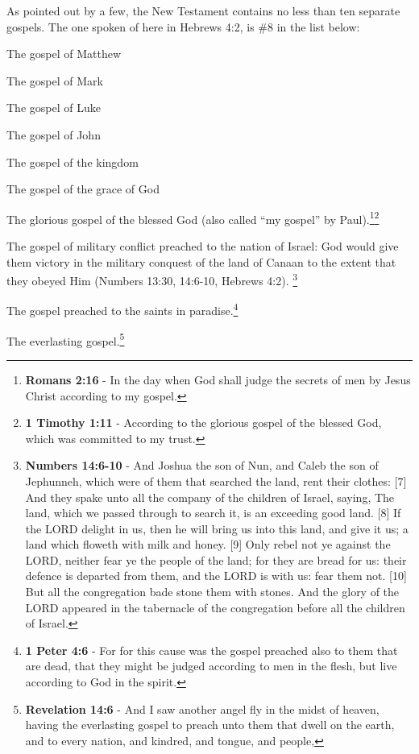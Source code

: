 As pointed out by a few, the New Testament contains no less than ten separate gospels. The one spoken of here in Hebrews 4:2, is \#8 in the list below:
\begin{compactenum}
	\item The gospel of Matthew
	\item The gospel of Mark
	\item The gospel of Luke
	\item The gospel of John
	\item The gospel of the kingdom
	\item The gospel of the grace of God
	\item The glorious gospel of the blessed God	(also called ``my gospel'' by Paul).\footnote{\textbf{Romans 2:16} - In the day when God shall judge the secrets of men by Jesus Christ according to my gospel.}\footnote{\textbf{1 Timothy 1:11} - According to the glorious gospel of the blessed God, which was committed to my trust.}
	\item The gospel of military conflict preached to the nation of Israel: God would give them victory in the military conquest of the land of Canaan to the extent that they obeyed Him (Numbers 13:30, 14:6-10, Hebrews 4:2). \footnote{\textbf{Numbers 14:6-10} - And Joshua the son of Nun, and Caleb the son of Jephunneh, which were of them that searched the land, rent their clothes: [7] And they spake unto all the company of the children of Israel, saying, The land, which we passed through to search it, is an exceeding good land. [8] If the LORD delight in us, then he will bring us into this land, and give it us; a land which floweth with milk and honey. [9] Only rebel not ye against the LORD, neither fear ye the people of the land; for they are bread for us: their defence is departed from them, and the LORD is with us: fear them not. [10] But all the congregation bade stone them with stones. And the glory of the LORD appeared in the tabernacle of the congregation before all the children of Israel.}
	\item The gospel preached to the saints in paradise.\footnote{\textbf{1 Peter 4:6} - For for this cause was the gospel preached also to them that are dead, that they might be judged according to men in the flesh, but live according to God in the spirit.}
	\item The everlasting gospel.\footnote{\textbf{Revelation 14:6} - And I saw another angel fly in the midst of heaven, having the everlasting gospel to preach unto them that dwell on the earth, and to every nation, and kindred, and tongue, and people,}
\end{compactenum}

